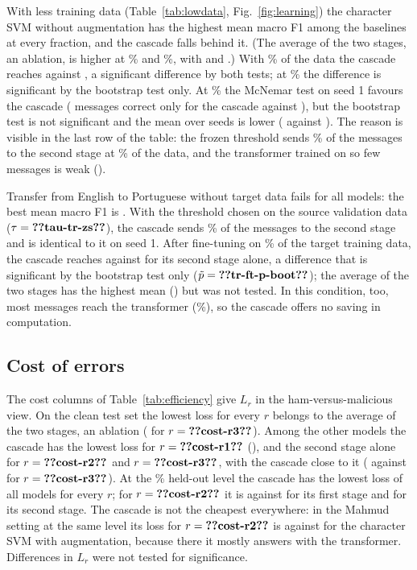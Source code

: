 With less training data (Table~\ref{tab:lowdata}, Fig.~\ref{fig:learning}) the character SVM without augmentation has the highest mean macro F1 among the baselines at every fraction, and the cascade falls behind it. (The average of the two stages, an ablation, is higher at \% and \%, with  and .) With \% of the data the cascade reaches  against , a significant difference by both tests; at \% the difference is significant by the bootstrap test only. At \% the McNemar test on seed 1 favours the cascade ( messages correct only for the cascade against ), but the bootstrap test is not significant and the mean over seeds is lower ( against ). The reason is visible in the last row of the table: the frozen threshold sends \% of the messages to the second stage at \% of the data, and the transformer trained on so few messages is weak ().

Transfer from English to Portuguese without target data fails for all models: the best mean macro F1 is . With the threshold chosen on the source validation data ($\tau=\val{tau-tr-zs}$), the cascade sends \% of the messages to the second stage and is identical to it on seed 1. After fine-tuning on \% of the target training data, the cascade reaches  against  for its second stage alone, a difference that is significant by the bootstrap test only ($\tilde{p}=\val{tr-ft-p-boot}$); the average of the two stages has the highest mean () but was not tested. In this condition, too, most messages reach the transformer (\%), so the cascade offers no saving in computation.

\subsection{Cost of errors}\label{sec:costres}

The cost columns of Table~\ref{tab:efficiency} give $L_r$ in the ham-versus-malicious view. On the clean test set the lowest loss for every $r$ belongs to the average of the two stages, an ablation ( for $r=\val{cost-r3}$). Among the other models the cascade has the lowest loss for $r=\val{cost-r1}$ (), and the second stage alone for $r=\val{cost-r2}$ and $r=\val{cost-r3}$, with the cascade close to it ( against  for $r=\val{cost-r3}$). At the \% held-out level the cascade has the lowest loss of all models for every $r$; for $r=\val{cost-r2}$ it is  against  for its first stage and  for its second stage. The cascade is not the cheapest everywhere: in the Mahmud setting at the same level its loss for $r=\val{cost-r2}$ is  against  for the character SVM with augmentation, because there it mostly answers with the transformer. Differences in $L_r$ were not tested for significance.

